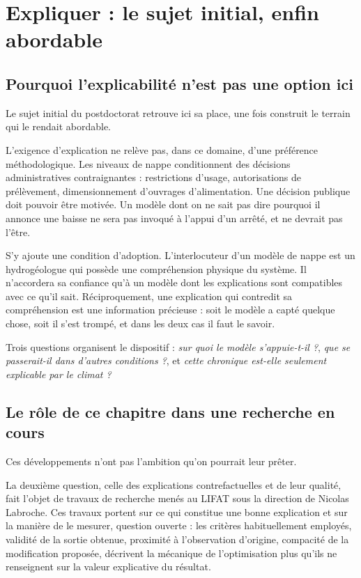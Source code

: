 \chapter{Expliquer : le sujet initial, enfin abordable}
\label{ch:xai}


\section{Pourquoi l'explicabilité n'est pas une option ici}

Le sujet initial du postdoctorat retrouve ici sa place, une fois construit le terrain qui le
rendait abordable.

L'exigence d'explication ne relève pas, dans ce domaine, d'une préférence méthodologique. Les
niveaux de nappe conditionnent des décisions administratives contraignantes : restrictions
d'usage, autorisations de prélèvement, dimensionnement d'ouvrages d'alimentation. Une décision
publique doit pouvoir être motivée. Un modèle dont on ne sait pas dire pourquoi il annonce une
baisse ne sera pas invoqué à l'appui d'un arrêté, et ne devrait pas l'être.

S'y ajoute une condition d'adoption. L'interlocuteur d'un modèle de nappe est un hydrogéologue
qui possède une compréhension physique du système. Il n'accordera sa confiance qu'à un modèle
dont les explications sont compatibles avec ce qu'il sait. Réciproquement, une explication
qui contredit sa compréhension est une information précieuse : soit le modèle a capté quelque
chose, soit il s'est trompé, et dans les deux cas il faut le savoir.

Trois questions organisent le dispositif : \emph{sur quoi le modèle s'appuie-t-il ?},
\emph{que se passerait-il dans d'autres conditions ?}, et \emph{cette chronique est-elle
seulement explicable par le climat ?}

\section{Le rôle de ce chapitre dans une recherche en cours}

Ces développements n'ont pas l'ambition qu'on pourrait leur prêter.

La deuxième question, celle des explications contrefactuelles et de leur qualité, fait l'objet
de travaux de recherche menés au LIFAT sous la direction de Nicolas Labroche. Ces travaux
portent sur ce qui constitue une bonne explication et sur la manière de le mesurer, question
ouverte : les critères habituellement employés, validité de la sortie obtenue, proximité à
l'observation d'origine, compacité de la modification proposée, décrivent la mécanique de
l'optimisation plus qu'ils ne renseignent sur la valeur explicative du résultat.

